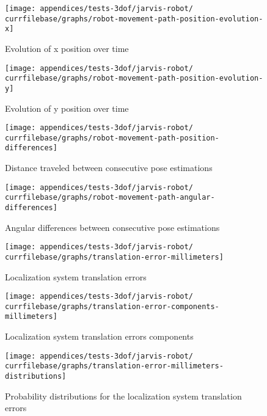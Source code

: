 \begin{figure}[H]
	\centering
	\texttt{[image: appendices/tests-3dof/jarvis-robot/\\currfilebase/graphs/robot-movement-path-position-evolution-x]}
	\caption{Evolution of x position over time}
\end{figure}

\begin{figure}[H]
	\centering
	\texttt{[image: appendices/tests-3dof/jarvis-robot/\\currfilebase/graphs/robot-movement-path-position-evolution-y]}
	\caption{Evolution of y position over time}
\end{figure}


\begin{figure}[H]
	\centering
	\texttt{[image: appendices/tests-3dof/jarvis-robot/\\currfilebase/graphs/robot-movement-path-position-differences]}
	\caption{Distance traveled between consecutive pose estimations}
\end{figure}


\begin{figure}[H]
	\centering
	\texttt{[image: appendices/tests-3dof/jarvis-robot/\\currfilebase/graphs/robot-movement-path-angular-differences]}
	\caption{Angular differences between consecutive pose estimations}
\end{figure}


\begin{figure}[H]
	\centering
	\texttt{[image: appendices/tests-3dof/jarvis-robot/\\currfilebase/graphs/translation-error-millimeters]}
	\caption{Localization system translation errors}
\end{figure}


\begin{figure}[H]
	\centering
	\texttt{[image: appendices/tests-3dof/jarvis-robot/\\currfilebase/graphs/translation-error-components-millimeters]}
	\caption{Localization system translation errors components}
\end{figure}


\begin{figure}[H]
	\centering
	\texttt{[image: appendices/tests-3dof/jarvis-robot/\\currfilebase/graphs/translation-error-millimeters-distributions]}
	\caption{Probability distributions for the localization system translation errors}
\end{figure}



